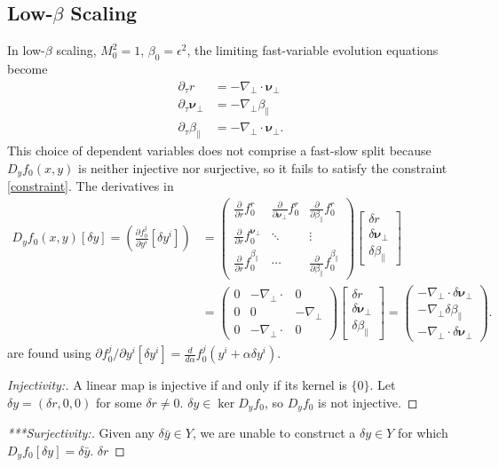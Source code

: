 \documentclass{article}
\newcommand{\para}{\parallel}
\newcommand{\ep}{\epsilon}
\newcommand{\np}{\nabla_\perp}
\newcommand{\p}{\partial}
\newcommand{\deriv}[2]{\frac{\p #1}{\p #2}}
\newcommand{\pth} [1] {\left( #1 \right) }
\newcommand{\br} [1] {\left[ #1 \right] }
\newcommand{\bmat} [1] {\begin{bmatrix} #1 \end{bmatrix}}
\newcommand{\pmat} [1] {\begin{pmatrix} #1 \end{pmatrix}}
\begin{document}
\subsection{Low-$\beta$ Scaling}
In low-$\beta$ scaling, $M_0^2 = 1$, $\beta_0 = \ep^2$, the limiting fast-variable evolution equations become
\begin{align*}
\p_\tau r &= -\np\cdot\bm{\nu}_\perp\\
\p_\tau \bm{\nu}_\perp & = -\np\beta_\para\\
\p_\tau \beta_\para & = -\np\cdot\bm{\nu}_\perp.
\end{align*}
This choice of dependent variables does not comprise a fast-slow split because $D_yf_0(x,y)$ is neither injective nor surjective, so it fails to satisfy the constraint \eqref{constraint}. The derivatives in
\begin{equation} \begin{split}
    D_yf_0(x,y) [\delta y] = \pth{\deriv{f_0^j}{y^i} \br{\delta y^i}} 
    &= \pmat{\deriv{}{r}f_0^r & \deriv{}{\bm{\nu}_\perp}f_0^r & \deriv{}{\beta_\para}f_0^r\\ \deriv{}{r}f_0^{\bm{\nu}_\perp} & \ddots & \vdots \\ \deriv{}{r}f_0^{\beta_\para} & \cdots & \deriv{}{\beta_\para}f_0^{\beta_\para}} 
    \bmat{\delta r \\ \delta \bm{\nu}_\perp \\ \delta \beta_\para} \\
    &= \pmat{0 & -\np \cdot & 0 \\ 0 & 0 & -\np \\ 0 & -\np \cdot & 0} 
    \bmat{\delta r \\ \delta \bm{\nu}_\perp \\ \delta \beta_\para}
    = \pmat{-\np \cdot \delta \bm{\nu}_\perp \\ -\np \delta \beta_\para \\ -\np \cdot \delta \bm{\nu}_\perp }.
\end{split} \end{equation}
are found using $\p f_0^j/\p y^i \br{\delta y^i} = \frac{d}{d\alpha} f_0^j \pth{y^i+ \alpha \delta y^i}$.  
\begin{proof} [Injectivity:] 
    A linear map is injective if and only if its kernel is $\{0\}$. Let $\delta y = \pth{\delta r,0,0}$ for some $\delta r\neq 0$. $\delta y \in\ker D_yf_0$, so $D_yf_0$ is not injective.
\end{proof}
\begin{proof} [***Surjectivity:] 
    Given any $\delta\bar{y}\in Y$, we are unable to construct a $\delta y\in Y$ for which $D_yf_0[\delta y] = \delta\bar{y}$.  $\delta r$
\end{proof}
\end{document}
